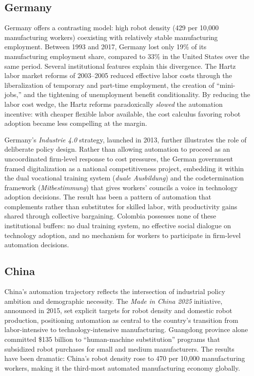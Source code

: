 \subsection{Germany}
\label{subsec:germany}

Germany offers a contrasting model: high robot density (429 per 10,000 manufacturing workers) coexisting with relatively stable manufacturing employment. Between 1993 and 2017, Germany lost only 19\% of its manufacturing employment share, compared to 33\% in the United States over the same period. Several institutional features explain this divergence. The Hartz labor market reforms of 2003--2005 reduced effective labor costs through the liberalization of temporary and part-time employment, the creation of ``mini-jobs,'' and the tightening of unemployment benefit conditionality. By reducing the labor cost wedge, the Hartz reforms paradoxically \textit{slowed} the automation incentive: with cheaper flexible labor available, the cost calculus favoring robot adoption became less compelling at the margin.

Germany's \textit{Industrie 4.0} strategy, launched in 2013, further illustrates the role of deliberate policy design. Rather than allowing automation to proceed as an uncoordinated firm-level response to cost pressures, the German government framed digitalization as a national competitiveness project, embedding it within the dual vocational training system (\textit{duale Ausbildung}) and the codetermination framework (\textit{Mitbestimmung}) that gives workers' councils a voice in technology adoption decisions. The result has been a pattern of automation that complements rather than substitutes for skilled labor, with productivity gains shared through collective bargaining. Colombia possesses none of these institutional buffers: no dual training system, no effective social dialogue on technology adoption, and no mechanism for workers to participate in firm-level automation decisions.

\subsection{China}
\label{subsec:china}

China's automation trajectory reflects the intersection of industrial policy ambition and demographic necessity. The \textit{Made in China 2025} initiative, announced in 2015, set explicit targets for robot density and domestic robot production, positioning automation as central to the country's transition from labor-intensive to technology-intensive manufacturing. Guangdong province alone committed \$135 billion to ``human-machine substitution'' programs that subsidized robot purchases for small and medium manufacturers. The results have been dramatic: China's robot density rose to 470 per 10,000 manufacturing workers, making it the third-most automated manufacturing economy globally.

